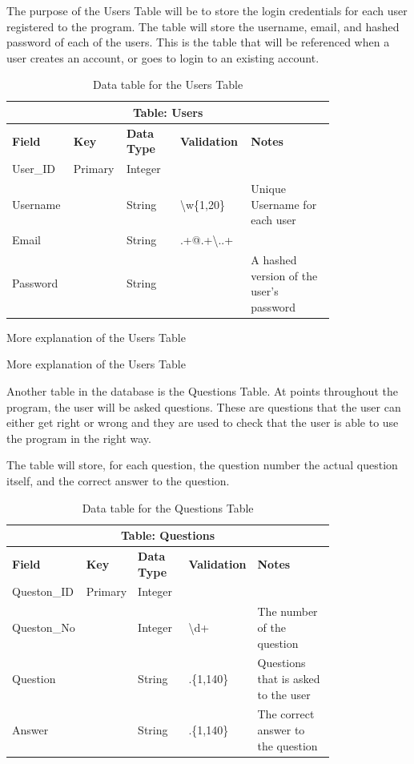 \documentclass{article}
\begin{document}
\clearpage

The purpose of the Users Table will be to store the login credentials for each user registered to the program. The table will store the username, email, and hashed password of each of the users. This is the table that will be referenced when a user creates an account, or goes to login to an existing account.

\begin{table}[ht]
    \centering
    \begin{tabular}{ | p{0.15\linewidth} | p{0.1\linewidth} | p{0.16\linewidth} | p{0.14\linewidth} | p{0.25\linewidth} | }
    \hline
    \multicolumn{5}{|c|}{\textbf{Table: Users}}\\
    \hline
    \hline
    \textbf{Field} & \textbf{Key} & \textbf{Data Type} & \textbf{Validation} & \textbf{Notes} \\
    \hline
    User\_ID & Primary & Integer & & \\
    \hline
    Username & & String & \textbackslash w\{1,20\} & Unique Username for each user\\
    \hline
    Email & & String & .+@.+\textbackslash ..+ & \\
    \hline
    Password & & String & & A hashed version of the user's password\\
    \hline
    \end{tabular}
    \caption{Data table for the Users Table}
\end{table}

More explanation of the Users Table

More explanation of the Users Table

Another table in the database is the Questions Table. At points throughout the program, the user will be asked questions. These are questions that the user can either get right or wrong and they are used to check that the user is able to use the program in the right way.

The table will store, for each question, the question number the actual question itself, and the correct answer to the question.

\begin{table}[ht]
    \centering
    \begin{tabular}{ | p{0.15\linewidth} | p{0.1\linewidth} | p{0.16\linewidth} | p{0.14\linewidth} | p{0.25\linewidth} | }
    \hline
    \multicolumn{5}{|c|}{\textbf{Table: Questions}}\\
    \hline
    \hline
    \textbf{Field} & \textbf{Key} & \textbf{Data Type} & \textbf{Validation} & \textbf{Notes} \\
    \hline
    Queston\_ID & Primary & Integer & & \\
    \hline
    Queston\_No & & Integer & \textbackslash d+ & The number of the question\\
    \hline
    Question & & String & .\{1,140\} & Questions that is asked to the user\\
    \hline
    Answer & & String & .\{1,140\} & The correct answer to the question\\
    \hline
    \end{tabular}
    \caption{Data table for the Questions Table}
\end{table}
\end{document}
